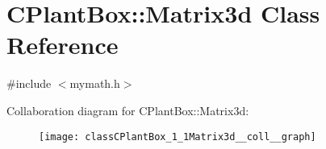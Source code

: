 \hypertarget{classCPlantBox_1_1Matrix3d}{}\section{C\+Plant\+Box\+:\+:Matrix3d Class Reference}
\label{classCPlantBox_1_1Matrix3d}


{\ttfamily \#include $<$mymath.\+h$>$}



Collaboration diagram for C\+Plant\+Box\+:\+:Matrix3d\+:\nopagebreak
\begin{figure}[H]
\begin{center}
\leavevmode
\texttt{[image: classCPlantBox\_1\_1Matrix3d\_\_coll\_\_graph]}
\end{center}
\end{figure}
